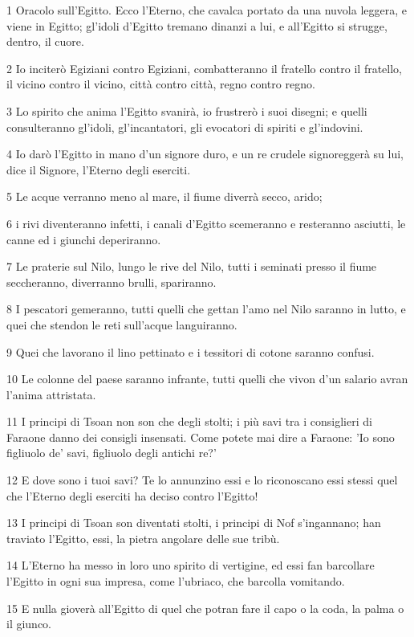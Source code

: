 \par 1 Oracolo sull'Egitto. Ecco l'Eterno, che cavalca portato da una nuvola leggera, e viene in Egitto; gl'idoli d'Egitto tremano dinanzi a lui, e all'Egitto si strugge, dentro, il cuore.
\par 2 Io inciterò Egiziani contro Egiziani, combatteranno il fratello contro il fratello, il vicino contro il vicino, città contro città, regno contro regno.
\par 3 Lo spirito che anima l'Egitto svanirà, io frustrerò i suoi disegni; e quelli consulteranno gl'idoli, gl'incantatori, gli evocatori di spiriti e gl'indovini.
\par 4 Io darò l'Egitto in mano d'un signore duro, e un re crudele signoreggerà su lui, dice il Signore, l'Eterno degli eserciti.
\par 5 Le acque verranno meno al mare, il fiume diverrà secco, arido;
\par 6 i rivi diventeranno infetti, i canali d'Egitto scemeranno e resteranno asciutti, le canne ed i giunchi deperiranno.
\par 7 Le praterie sul Nilo, lungo le rive del Nilo, tutti i seminati presso il fiume seccheranno, diverranno brulli, spariranno.
\par 8 I pescatori gemeranno, tutti quelli che gettan l'amo nel Nilo saranno in lutto, e quei che stendon le reti sull'acque languiranno.
\par 9 Quei che lavorano il lino pettinato e i tessitori di cotone saranno confusi.
\par 10 Le colonne del paese saranno infrante, tutti quelli che vivon d'un salario avran l'anima attristata.
\par 11 I principi di Tsoan non son che degli stolti; i più savi tra i consiglieri di Faraone danno dei consigli insensati. Come potete mai dire a Faraone: 'Io sono figliuolo de' savi, figliuolo degli antichi re?'
\par 12 E dove sono i tuoi savi? Te lo annunzino essi e lo riconoscano essi stessi quel che l'Eterno degli eserciti ha deciso contro l'Egitto!
\par 13 I principi di Tsoan son diventati stolti, i principi di Nof s'ingannano; han traviato l'Egitto, essi, la pietra angolare delle sue tribù.
\par 14 L'Eterno ha messo in loro uno spirito di vertigine, ed essi fan barcollare l'Egitto in ogni sua impresa, come l'ubriaco, che barcolla vomitando.
\par 15 E nulla gioverà all'Egitto di quel che potran fare il capo o la coda, la palma o il giunco.

